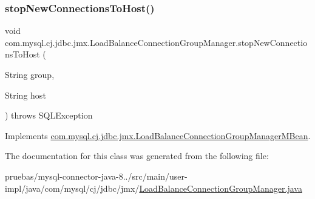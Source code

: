 \mbox{\label{classcom_1_1mysql_1_1cj_1_1jdbc_1_1jmx_1_1_load_balance_connection_group_manager_aded5d0e2efbd9f4a39e3347da772412a}} 
\subsubsection{\texorpdfstring{stop\+New\+Connections\+To\+Host()}{stopNewConnectionsToHost()}}
{\footnotesize\ttfamily void com.\+mysql.\+cj.\+jdbc.\+jmx.\+Load\+Balance\+Connection\+Group\+Manager.\+stop\+New\+Connections\+To\+Host (\begin{DoxyParamCaption}\item[{String}]{group,  }\item[{String}]{host }\end{DoxyParamCaption}) throws S\+Q\+L\+Exception}



Implements \mbox{\hyperlink{interfacecom_1_1mysql_1_1cj_1_1jdbc_1_1jmx_1_1_load_balance_connection_group_manager_m_bean_a8f15db86412fbd3a8e43da0e1bc78fd6}{com.\+mysql.\+cj.\+jdbc.\+jmx.\+Load\+Balance\+Connection\+Group\+Manager\+M\+Bean}}.



The documentation for this class was generated from the following file\+:\begin{DoxyCompactItemize}
\item 
pruebas/mysql-\/connector-\/java-\/8../src/main/user-\/impl/java/com/mysql/cj/jdbc/jmx/\mbox{\hyperlink{_load_balance_connection_group_manager_8java}{Load\+Balance\+Connection\+Group\+Manager.\+java}}\end{DoxyCompactItemize}
